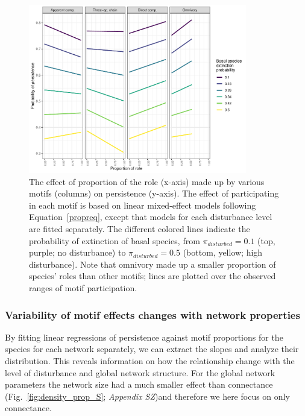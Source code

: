 \documentclass[12pt]{article}
\begin{document}
\begin{spacing}{2.0}
            
            \begin{figure}[h!]
                \centering
                \includegraphics[width=0.85\textwidth]{figures/prop_lmer_allCS.pdf}
                \caption{The effect of proportion of the role (x-axis) made up by various motifs (columns) on persistence (y-axis). The effect of participating in each motif is based on linear mixed-effect models following Equation~\ref{propreq}, except that models for each  disturbance level are fitted separately. The different colored lines indicate the probability of extinction of basal species, from $\pi_{disturbed} = 0.1$ (top, purple; no disturbance) to $\pi_{disturbed} = 0.5$ (bottom, yellow; high disturbance). Note that omnivory made up a smaller proportion of species' roles than other motifs; lines are plotted over the observed ranges of motif participation.}
                \label{fig:prop_lmer_all}
            \end{figure}
        
        \clearpage
    
        \subsubsection*{Variability of motif effects changes with network properties}

            By fitting linear regressions of persistence against motif proportions for the species for each network separately, we can extract the slopes and analyze their distribution. This reveals information on how the relationship change with the level of disturbance and global network structure. For the global network parameters the network size had a much smaller effect than connectance (Fig.~\ref{fig:density_prop_S}; \emph{Appendix SZ})and therefore we here focus on only connectance. 
            

\end{spacing}
\end{document}

